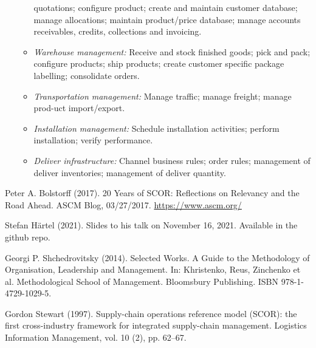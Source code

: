 \documentclass[11pt,a4paper]{article}
\begin{document}
\begin{itemize}
\begin{itemize}
    quotations; configure product; create and maintain customer database;
    manage allocations; maintain product/price database; manage accounts
    receivables, credits, collections and invoicing.
  \item \emph{Warehouse management:} Receive and stock finished goods; pick
    and pack; configure products; ship products; create customer specific
    package labelling; consolidate orders.
  \item \emph{Transportation management:} Manage traffic; manage freight;
    manage prod-uct import/export.
  \item \emph{Installation management:} Schedule installation activities;
    perform installation; verify performance.
  \item \emph{Deliver infrastructure:} Channel business rules; order rules;
    management of deliver inventories; management of deliver quantity.
  \end{itemize}
\end{itemize}

\begin{thebibliography}{xxx}
 Peter A. Bolstorff (2017).  20 Years of SCOR:
  Reflections on Relevancy and the Road Ahead. ASCM Blog, 03/27/2017.
  \url{https://www.ascm.org/}
  
 Stefan Härtel (2021). Slides to his talk on November 16,
  2021.  Available in the github repo.

 Georgi P. Shchedrovitsky (2014). Selected Works.
  A Guide to the Methodology of Organisation, Leadership and Management. In:
  Khristenko, Reus, Zinchenko et al. Methodological School of Management.
  Bloomsbury Publishing.  ISBN 978-1-4729-1029-5.

 Gordon Stewart (1997). Supply-chain operations reference
  model (SCOR): the first cross-industry framework for integrated supply-chain
  management. Logistics Information Management, vol. 10 (2), pp. 62–67.
\end{thebibliography}
\end{document}
